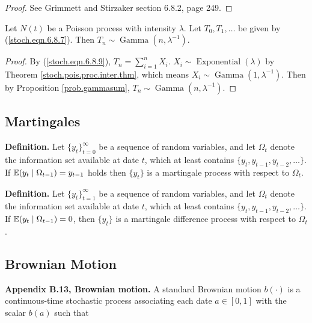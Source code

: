 \begin{proof}See Grimmett and Stirzaker section 6.8.2, page 249. \end{proof}

\begin{corollary}\label{stoch.pois.proc.inter.cor} 
Let \(N(t)\) be a Poisson process with intensity \(\lambda\). Let \(T_0, T_1, \ldots\) be given by (\ref{stoch.eqn.6.8.7}). Then \(T_n \sim \operatorname{Gamma}(n, \lambda^{-1})\).
\end{corollary}

\begin{proof}
By (\ref{stoch.eqn.6.8.9}), \(T_n = \sum_{i=1}^n X_i\). \(X_i \sim \operatorname{Exponential}(\lambda) \) by Theorem \ref{stoch.pois.proc.inter.thm}, which means \(X_i \sim \operatorname{Gamma}(1, \lambda^{-1})\). Then by Proposition \ref{prob.gammasum}, \(T_n \sim \operatorname{Gamma}(n, \lambda^{-1})\).
\end{proof}

\subsection{Martingales}

\textbf{Definition.} Let \(\{y_t\}_{t=0}^\infty \) be a sequence of random variables, and let \(\Omega_t\) denote the information set available at date \(t\), which at least contains \(\{y_t, y_{t-1}, y_{t-2}, \ldots \}\). If \(\E(y_t \mid \Omega_{t-1}) = y_{t-1}\) holds then \(\{y_t\}\) is a martingale process with respect to \(\Omega_t\).

\textbf{Definition.} Let \(\{y_t\}_{t=1}^\infty \) be a sequence of random variables, and let \(\Omega_t\) denote the information set available at date \(t\), which at least contains \(\{y_t, y_{t-1}, y_{t-2}, \ldots \}\). If \(\E(y_t \mid \Omega_{t-1}) =0\), then \(\{y_t\}\) is a martingale difference process with respect to \(\Omega_t\).

\subsection{Brownian Motion}

%
\textbf{Appendix B.13, Brownian motion.} A standard Brownian motion \(b(\cdot)\) is a continuous-time stochastic process associating each date \(a \in [0, 1]\) with the scalar \(b(a)\) such that

